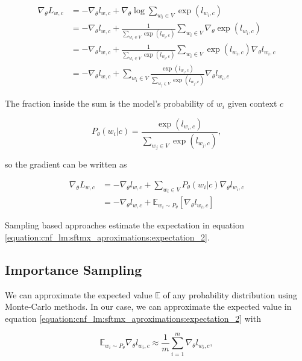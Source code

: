 \begin{align}
    \nabla_\theta L_{w, c} &= - \nabla_\theta l_{w, c} + \nabla_\theta \log \sum_{w_i \in V} \exp(l_{w_i,c}) \\
                           &= - \nabla_\theta l_{w, c} + \frac{1}{\sum_{w_i \in V} \exp(l_{w_i,c})} \sum_{w_i \in V} \nabla_\theta \exp(l_{w_i,c}) \\
                           &= - \nabla_\theta l_{w, c} + \frac{1}{\sum_{w_i \in V} \exp(l_{w_i,c})} \sum_{w_i \in V} \exp(l_{w_i,c}) \nabla_\theta l_{w_i, c} \\
                           &= - \nabla_\theta l_{w, c} + \sum_{w_i \in V} \frac{\exp(l_{w_i,c})}{\sum_{w_j \in V} \exp(l_{w_j,c})} \nabla_\theta l_{w_i, c}
\end{align}

The fraction inside the sum is the model's probability of $ w_i $ given context $ c $

\begin{displaymath}
    P_\theta(w_i | c) = \frac{\exp(l_{w_i,c})}{\sum_{w_j \in V} \exp(l_{w_j,c})},
\end{displaymath}

so the gradient can be written as

\begin{align}
    \label{equation:cnf_lm:sftmx_aproximations:expectation_1}
    \nabla_\theta L_{w, c} &= - \nabla_\theta l_{w, c} + \sum_{w_i \in V}  P_\theta(w_i | c) \nabla_\theta l_{w_i, c} \\
                           \label{equation:cnf_lm:sftmx_aproximations:expectation_2}
                           &= - \nabla_\theta l_{w, c} + \mathbb{E}_{w_i \sim P_\theta} [ \nabla_\theta l_{w_i, c} ]
\end{align}

Sampling based approaches estimate the expectation in equation \ref{equation:cnf_lm:sftmx_aproximations:expectation_2}.

\subsection{Importance Sampling}
We can approximate the expected value $ \mathbb{E} $ of any probability distribution using Monte-Carlo methods. In our case, we can approximate the expected value in equation \ref{equation:cnf_lm:sftmx_aproximations:expectation_2} with

\begin{displaymath}
    \mathbb{E}_{w_i \sim P_\theta} \nabla_\theta l_{w_i, c} \approx \frac{1}{m} \sum_{i=1}^m \nabla_\theta l_{w_i, c},
\end{displaymath}

